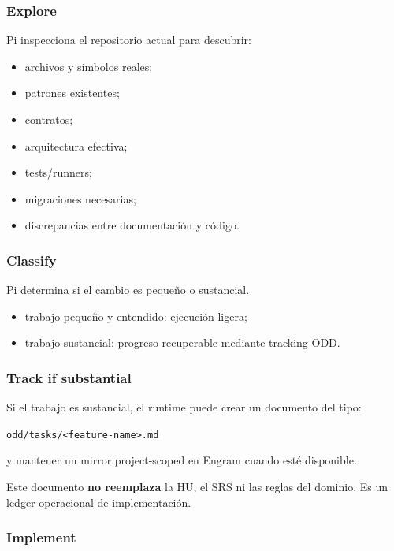 \documentclass[11pt,a4paper]{article}
\newcommand{\artifact}[1]{\texttt{#1}}
\begin{document}
\subsubsection{Explore}

Pi inspecciona el repositorio actual para descubrir:

\begin{itemize}
    \item archivos y símbolos reales;
    \item patrones existentes;
    \item contratos;
    \item arquitectura efectiva;
    \item tests/runners;
    \item migraciones necesarias;
    \item discrepancias entre documentación y código.
\end{itemize}

\subsubsection{Classify}

Pi determina si el cambio es pequeño o sustancial.

\begin{itemize}
    \item trabajo pequeño y entendido: ejecución ligera;
    \item trabajo sustancial: progreso recuperable mediante tracking ODD.
\end{itemize}

\subsubsection{Track if substantial}

Si el trabajo es sustancial, el runtime puede crear un documento del tipo:

\begin{center}
\artifact{odd/tasks/<feature-name>.md}
\end{center}

y mantener un mirror project-scoped en Engram cuando esté disponible.

Este documento \textbf{no reemplaza} la HU, el SRS ni las reglas del dominio. Es un ledger operacional de implementación.

\subsubsection{Implement}
\end{document}

